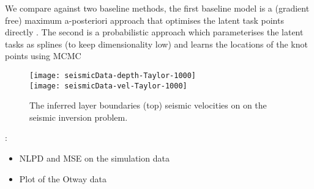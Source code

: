 We compare against two baseline methods, the first baseline model is a
(gradient free) maximum a-posteriori approach that optimises the latent task
points directly . The second is a
probabilistic approach which parameterises the latent tasks as splines (to keep
dimensionality low) and learns the locations of the knot points using MCMC

\begin{figure}
\texttt{[image: seismicData-depth-Taylor-1000]} \\
\texttt{[image: seismicData-vel-Taylor-1000]}
\caption{The inferred layer boundaries (top) seismic velocities on
 on the seismic inversion problem. }
\end{figure}

:
\begin{itemize}
    \item NLPD and MSE on the simulation data
    \item Plot of the Otway data
\end{itemize}
